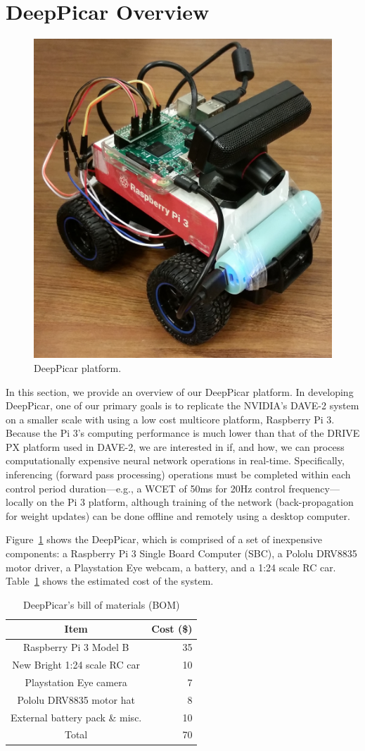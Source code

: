 \section{DeepPicar Overview}

\begin{figure}[t]
  \centering
  \includegraphics[width=.4\textwidth]{figs/DeepPicar_platform}
  \caption{DeepPicar platform.}
  \label{fig:overview}
\end{figure}

In this section, we provide an overview of our DeepPicar platform. In
developing DeepPicar, one of our primary goals is to replicate the
NVIDIA's DAVE-2 system on a smaller scale with using a low cost
multicore platform, Raspberry Pi 3. Because the Pi 3's computing
performance is much lower than that of the DRIVE PX platform used in
DAVE-2, we are interested in if, and how, we can process
computationally expensive neural network operations in
real-time. Specifically, inferencing (forward pass processing)
operations must be completed within each control period
duration---e.g., a WCET of 50ms for 20Hz control frequency---locally on
the Pi 3 platform, although training of the network (back-propagation
for weight updates) can be done offline and remotely using a desktop
computer.

Figure~\ref{fig:overview} shows the DeepPicar, which is comprised of a
set of inexpensive components: a Raspberry Pi 3 Single Board Computer
(SBC), a Pololu DRV8835 motor driver, a Playstation Eye webcam, a
battery, and a 1:24 scale RC car. Table~\ref{tbl:carbom} shows the
estimated cost of the system.

\begin{table}[t]
  \centering
  \begin{tabular}{|c|r|}
    \hline
    Item                    & Cost (\$) \\
    \hline
    Raspberry Pi 3 Model B  & 35 \\
    New Bright 1:24 scale RC car       & 10 \\
    Playstation Eye camera  &  7 \\
    Pololu DRV8835 motor hat&  8 \\
    External battery pack \& misc.   & 10 \\
    \hline
    Total                   & 70 \\
    \hline
  \end{tabular}
  \caption{DeepPicar's bill of materials (BOM)}
  \label{tbl:carbom}
\end{table}


